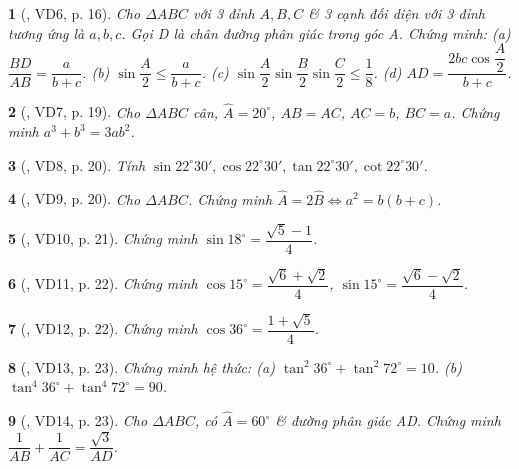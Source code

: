 \documentclass{article}
\newtheorem{baitoan}{}
\begin{document}
\begin{baitoan}[\cite{Kien_hinh_hoc_9}, VD6, p. 16]
	Cho $\Delta ABC$ với 3 đỉnh $A,B,C$ \& 3 cạnh đối diện với 3 đỉnh tương ứng là $a,b,c$. Gọi D là chân đường phân giác trong góc A. Chứng minh: (a) $\dfrac{BD}{AB} = \dfrac{a}{b + c}$. (b) $\sin\dfrac{A}{2}\le\dfrac{a}{b + c}$. (c) $\sin\dfrac{A}{2}\sin\dfrac{B}{2}\sin\dfrac{C}{2}\le\dfrac{1}{8}$. (d) $AD = \dfrac{2bc\cos\dfrac{A}{2}}{b + c}$.
\end{baitoan}

\begin{baitoan}[\cite{Kien_hinh_hoc_9}, VD7, p. 19]
	Cho $\Delta ABC$ cân, $\widehat{A} = 20^\circ$, $AB = AC$, $AC = b$, $BC = a$. Chứng minh $a^3 + b^3 = 3ab^2$.
\end{baitoan}

\begin{baitoan}[\cite{Kien_hinh_hoc_9}, VD8, p. 20]
	Tính $\sin22^\circ30',\cos22^\circ30',\tan22^\circ30',\cot22^\circ30'$.
\end{baitoan}

\begin{baitoan}[\cite{Kien_hinh_hoc_9}, VD9, p. 20]
	Cho $\Delta ABC$. Chứng minh $
	\widehat{A} = 2\widehat{B}\Leftrightarrow a^2 = b(b + c)$.
\end{baitoan}

\begin{baitoan}[\cite{Kien_hinh_hoc_9}, VD10, p. 21]
	Chứng minh $\sin18^\circ = \dfrac{\sqrt{5} - 1}{4}$.
\end{baitoan}

\begin{baitoan}[\cite{Kien_hinh_hoc_9}, VD11, p. 22]
	Chứng minh $\cos15^\circ = \dfrac{\sqrt{6} + \sqrt{2}}{4}$, $\sin15^\circ = \dfrac{\sqrt{6} - \sqrt{2}}{4}$.
\end{baitoan}

\begin{baitoan}[\cite{Kien_hinh_hoc_9}, VD12, p. 22]
	Chứng minh $\cos36^\circ = \dfrac{1 + \sqrt{5}}{4}$.	
\end{baitoan}

\begin{baitoan}[\cite{Kien_hinh_hoc_9}, VD13, p. 23]
	Chứng minh hệ thức: (a) $\tan^2 36^\circ + \tan^2 72^\circ = 10$. (b) $\tan^4 36^\circ + \tan^4 72^\circ = 90$.
\end{baitoan}

\begin{baitoan}[\cite{Kien_hinh_hoc_9}, VD14, p. 23]
	Cho $\Delta ABC$, có $\widehat{A} = 60^\circ$ \& đường phân giác AD. Chứng minh $\dfrac{1}{AB} + \dfrac{1}{AC} = \dfrac{\sqrt{3}}{AD}$.
\end{baitoan}
\end{document}
